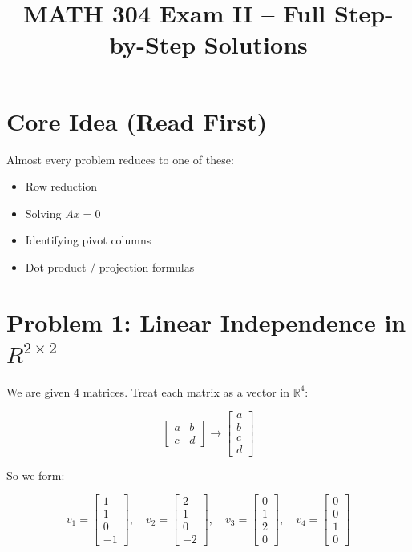 \documentclass[11pt]{article}
\title{MATH 304 Exam II -- Full Step-by-Step Solutions}
\date{}
\begin{document}
\maketitle

\section*{Core Idea (Read First)}
Almost every problem reduces to one of these:
\begin{itemize}
    \item Row reduction
    \item Solving $Ax=0$
    \item Identifying pivot columns
    \item Dot product / projection formulas
\end{itemize}

\hrulefill

\section*{Problem 1: Linear Independence in $R^{2\times2}$}

We are given 4 matrices. Treat each matrix as a vector in $\mathbb{R}^4$:

\[
\begin{bmatrix} a & b \\ c & d \end{bmatrix}
\rightarrow
\begin{bmatrix} a \\ b \\ c \\ d \end{bmatrix}
\]

So we form:

\[
v_1 =
\begin{bmatrix}1\\1\\0\\-1\end{bmatrix},\quad
v_2 =
\begin{bmatrix}2\\1\\0\\-2\end{bmatrix},\quad
v_3 =
\begin{bmatrix}0\\1\\2\\0\end{bmatrix},\quad
v_4 =
\begin{bmatrix}0\\0\\1\\0\end{bmatrix}
\]
\end{document}
